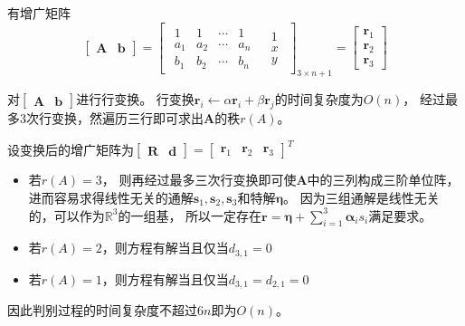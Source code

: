 \begin{questions}
\begin{solution}
        有增广矩阵
        \[
            \begin{bmatrix}
                \bm A & \bm b
            \end{bmatrix}
            = \left[
                \begin{array}{c|c}
                    \begin{matrix}
                        1   & 1   & \cdots & 1   \\
                        a_1 & a_2 & \cdots & a_n \\
                        b_1 & b_2 & \cdots & b_n
                    \end{matrix} &
                    \begin{matrix}
                        1 \\
                        x \\
                        y
                    \end{matrix}
                \end{array}
                \right]_{3\times n+1}
            =\begin{bmatrix}
                \bm r_1 \\ \bm r_2 \\ \bm r_3
            \end{bmatrix}
        \]

        对$\begin{bmatrix} \bm A & \bm b \end{bmatrix}$进行行变换。
        行变换$\bm r_i \gets \alpha \bm r_i + \beta \bm r_j$的时间复杂度为$O(n)$，
        经过最多3次行变换，然遍历三行即可求出$\bm A$的秩$r(A)$。


        设变换后的增广矩阵为$
            \begin{bmatrix} \bm R & \bm d \end{bmatrix}
            =\begin{bmatrix}
                \bm r_1 & \bm r_2 & \bm r_3
            \end{bmatrix}^T
        $
        \begin{itemize}
            \item 若$r(A) = 3$，
                  则再经过最多三次行变换即可使$\bm A$中的三列构成三阶单位阵，
                  进而容易求得线性无关的通解$\bm s_1,\bm s_2,\bm s_3$和特解$\bm \eta$。
                  因为三组通解是线性无关的，可以作为$\mathbb{R}^3$的一组基，
                  所以一定存在$\bm r = \bm \eta + \sum_{i=1}^3 \bm \alpha_i s_i$满足要求。
            \item 若$r(A) = 2$，则方程有解当且仅当$d_{3,1} = 0$
            \item 若$r(A) = 1$，则方程有解当且仅当$d_{3,1} = d_{2,1} = 0$
        \end{itemize}

        因此判别过程的时间复杂度不超过$6n$即为$O(n)$。
    \end{solution}

\end{questions}


